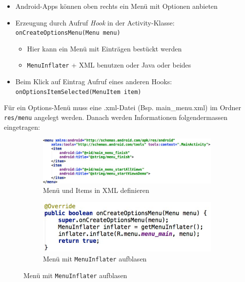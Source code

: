 \documentclass[a4paper]{article}
\begin{document}
\begin{itemize}
	\item Android-Apps können oben rechts ein Menü mit Optionen anbieten
	\item Erzeugung durch Aufruf \textit{Hook} in der Activity-Klasse:\\
	\texttt{onCreateOptionsMenu(Menu menu)}
	\begin{itemize}
		\item Hier kann ein Menü mit Einträgen bestückt werden
		\item \texttt{MenuInflater} + XML benutzen oder Java oder beides
	\end{itemize}
	\item Beim Klick auf Eintrag Aufruf eines anderen Hooks:\\
	\texttt{onOptionsItemSelected(MenuItem item)}
\end{itemize}
\noindent
Für ein Options-Menü muss eine .xml-Datei (Bsp. main\_menu.xml) im Ordner \texttt{res/menu} angelegt werden. Danach werden Informationen folgendermassen eingetragen:
\begin{figure}[htb!]
	\begin{subfigure}{0.5\textwidth}
		\centering
		\includegraphics[width=\linewidth]{img/menu_example.jpg}
		\caption{Menü und Items in XML definieren}
	\end{subfigure}
	\begin{subfigure}{0.5\textwidth}
		\centering
		\includegraphics[width=\linewidth]{img/menuinflater.jpg}
		\caption{Menü mit \texttt{MenuInflater} aufblasen}
	\end{subfigure}
\end{figure}
\end{document}
